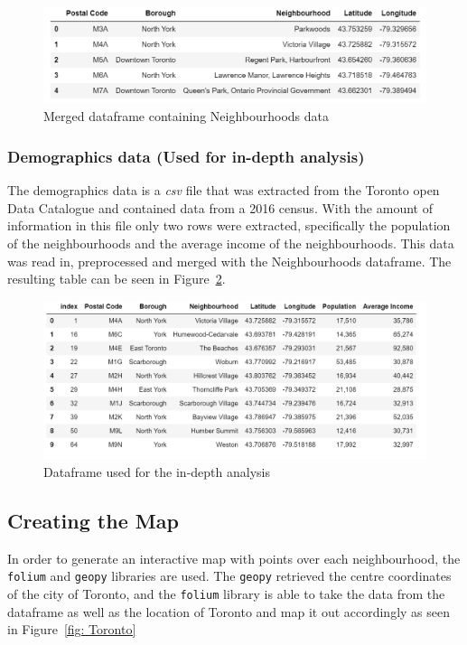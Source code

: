 \documentclass[12pt, conference]{IEEEtran}
\def\code#1{\texttt{#1}}
\begin{document}
\begin{figure}[!h]
\center
\includegraphics[scale=0.8]{Finaldf}
\caption{Merged dataframe containing Neighbourhoods data}
\label{fig: Finaldf}
\end{figure}

\subsubsection{Demographics data (Used for in-depth analysis)}
The demographics data is a \textit{csv} file that was extracted from the Toronto open Data Catalogue and contained data from a 2016 census. With the amount of information in this file only two rows were extracted, specifically the population of the neighbourhoods and the average income of the neighbourhoods. This data was read in, preprocessed and merged with the Neighbourhoods dataframe. The resulting table can be seen in Figure~\ref{fig: InDepth}.

\begin{figure}[!h]
\center
\includegraphics[scale=0.8]{InDepthTable}
\caption{Dataframe used for the in-depth analysis}
\label{fig: InDepth}
\end{figure}

\subsection{Creating the Map}
In order to generate an interactive map with points over each neighbourhood, the \code{folium} and \code{geopy} libraries are used. The \code{geopy} retrieved the centre coordinates of the city of Toronto, and the \code{folium} library is able to take the data from the dataframe as well as the location of Toronto and map it out accordingly as seen in Figure~\ref{fig: Toronto}
\end{document}
